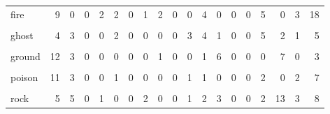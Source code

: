 \documentclass[
  12pt,
]{extreport}
\begin{document}
\begin{table}[H]
\begin{tabular}[t]{lrrrrrrrrrrrrrrrrrr}
fire & 9 & 0 & 0 & 2 & 2 & 0 & 1 & 2 & 0 & 0 & 4 & 0 & 0 & 0 & 5 & 0 & 3 & 18\\
\cellcolor{gray!10}{flying} & \cellcolor{gray!10}{4} & \cellcolor{gray!10}{0} & \cellcolor{gray!10}{0} & \cellcolor{gray!10}{0} & \cellcolor{gray!10}{0} & \cellcolor{gray!10}{0} & \cellcolor{gray!10}{0} & \cellcolor{gray!10}{0} & \cellcolor{gray!10}{0} & \cellcolor{gray!10}{0} & \cellcolor{gray!10}{0} & \cellcolor{gray!10}{0} & \cellcolor{gray!10}{0} & \cellcolor{gray!10}{0} & \cellcolor{gray!10}{0} & \cellcolor{gray!10}{0} & \cellcolor{gray!10}{0} & \cellcolor{gray!10}{3}\\
ghost & 4 & 3 & 0 & 0 & 2 & 0 & 0 & 0 & 0 & 3 & 4 & 1 & 0 & 0 & 5 & 2 & 1 & 5\\
\addlinespace
\cellcolor{gray!10}{grass} & \cellcolor{gray!10}{11} & \cellcolor{gray!10}{3} & \cellcolor{gray!10}{0} & \cellcolor{gray!10}{1} & \cellcolor{gray!10}{3} & \cellcolor{gray!10}{0} & \cellcolor{gray!10}{1} & \cellcolor{gray!10}{0} & \cellcolor{gray!10}{0} & \cellcolor{gray!10}{0} & \cellcolor{gray!10}{13} & \cellcolor{gray!10}{0} & \cellcolor{gray!10}{0} & \cellcolor{gray!10}{0} & \cellcolor{gray!10}{5} & \cellcolor{gray!10}{7} & \cellcolor{gray!10}{2} & \cellcolor{gray!10}{35}\\
ground & 12 & 3 & 0 & 0 & 0 & 0 & 0 & 1 & 0 & 0 & 1 & 6 & 0 & 0 & 0 & 7 & 0 & 3\\
\cellcolor{gray!10}{ice} & \cellcolor{gray!10}{3} & \cellcolor{gray!10}{0} & \cellcolor{gray!10}{0} & \cellcolor{gray!10}{0} & \cellcolor{gray!10}{1} & \cellcolor{gray!10}{0} & \cellcolor{gray!10}{0} & \cellcolor{gray!10}{0} & \cellcolor{gray!10}{0} & \cellcolor{gray!10}{0} & \cellcolor{gray!10}{2} & \cellcolor{gray!10}{0} & \cellcolor{gray!10}{0} & \cellcolor{gray!10}{0} & \cellcolor{gray!10}{5} & \cellcolor{gray!10}{2} & \cellcolor{gray!10}{0} & \cellcolor{gray!10}{10}\\
poison & 11 & 3 & 0 & 0 & 1 & 0 & 0 & 0 & 0 & 1 & 1 & 0 & 0 & 0 & 2 & 0 & 2 & 7\\
\cellcolor{gray!10}{psychic} & \cellcolor{gray!10}{4} & \cellcolor{gray!10}{2} & \cellcolor{gray!10}{0} & \cellcolor{gray!10}{0} & \cellcolor{gray!10}{3} & \cellcolor{gray!10}{0} & \cellcolor{gray!10}{1} & \cellcolor{gray!10}{1} & \cellcolor{gray!10}{0} & \cellcolor{gray!10}{1} & \cellcolor{gray!10}{2} & \cellcolor{gray!10}{0} & \cellcolor{gray!10}{0} & \cellcolor{gray!10}{0} & \cellcolor{gray!10}{14} & \cellcolor{gray!10}{0} & \cellcolor{gray!10}{0} & \cellcolor{gray!10}{23}\\
\addlinespace
rock & 5 & 5 & 0 & 1 & 0 & 0 & 2 & 0 & 0 & 1 & 2 & 3 & 0 & 0 & 2 & 13 & 3 & 8\\

\end{tabular}
\end{table}
\end{document}
